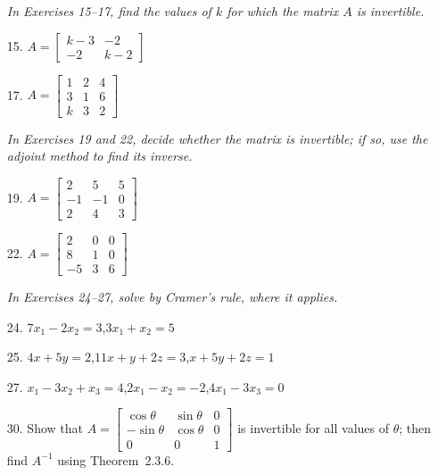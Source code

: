 \documentclass{article}
\theoremstyle{mystyle}
\begin{document}
\begin{enumerate}
\noindent\textit{In Exercises 15--17, find the values of $k$ for which the matrix $A$
is invertible.}

\item[15.] $A=\begin{bmatrix}k-3&-2\\-2&k-2\end{bmatrix}$

\item[17.] $A=\begin{bmatrix}1&2&4\\3&1&6\\k&3&2\end{bmatrix}$

\noindent\textit{In Exercises 19 and 22, decide whether the matrix is invertible; if so,
use the adjoint method to find its inverse.}

\item[19.] $A=\begin{bmatrix}2&5&5\\-1&-1&0\\2&4&3\end{bmatrix}$

\item[22.] $A=\begin{bmatrix}2&0&0\\8&1&0\\-5&3&6\end{bmatrix}$

\noindent\textit{In Exercises 24--27, solve by Cramer's rule, where it applies.}

\item[24.] $7x_1-2x_2=3$,\quad $3x_1+x_2=5$

\item[25.] $4x+5y=2$,\quad $11x+y+2z=3$,\quad $x+5y+2z=1$

\item[27.] $x_1-3x_2+x_3=4$,\quad $2x_1-x_2=-2$,\quad $4x_1-3x_3=0$

\item[30.] Show that
$A=\begin{bmatrix}\cos\theta&\sin\theta&0\\-\sin\theta&\cos\theta&0\\0&0&1\end{bmatrix}$
is invertible for all values of $\theta$; then find $A^{-1}$ using Theorem~2.3.6.


\end{enumerate}
\end{document}

